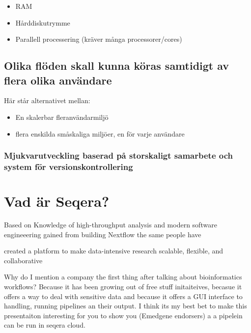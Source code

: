 \documentclass[
  letterpaper,
  DIV=11,
  numbers=noendperiod]{scrreprt}
\begin{document}
\begin{itemize}
\item
  RAM
\item
  Hårddiskutrymme
\item
  Parallell processering (kräver många processorer/cores)
\end{itemize}

\section{Olika flöden skall kunna köras samtidigt av flera olika
användare}\label{olika-fluxf6den-skall-kunna-kuxf6ras-samtidigt-av-flera-olika-anvuxe4ndare}

Här står alternativet mellan:

\begin{itemize}
\item
  En skalerbar fleranvändarmiljö
\item
  flera enskilda småskaliga miljöer, en för varje användare
\end{itemize}

\subsection{Mjukvarutveckling baserad på storskaligt samarbete och
system för
versionskontrollering}\label{mjukvarutveckling-baserad-puxe5-storskaligt-samarbete-och-system-fuxf6r-versionskontrollering}


\chapter{Vad är Seqera?}\label{vad-uxe4r-seqera}

Based on Knowledge of high-throughput analysis and modern software
engineeering gained from building Nextflow the same people have

created a platform to make data-intensive research scalable, flexible,
and collaborative

Why do I mention a company the first thing after talking about
bioinformatics workflows? Because it has been growing out of free stuff
initaiteives, becasue it offers a way to deal with sensitive data and
because it offers a GUI interface to handling, running pipelines an
their output. I think its my best bet to make this presentaiton
interesting for you to show you (Emedgene endorsers) a a pipelein can be
run in seqera cloud.
\end{document}
